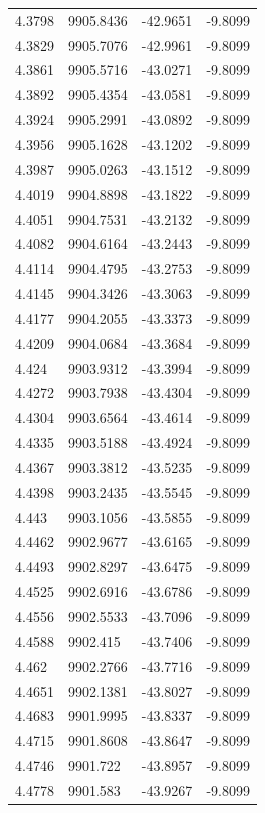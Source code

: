 \begin{table}[H]
\begin{tabular}{llll}
4.3798 & 9905.8436 & -42.9651 & -9.8099 \\
4.3829 & 9905.7076 & -42.9961 & -9.8099 \\
4.3861 & 9905.5716 & -43.0271 & -9.8099 \\
4.3892 & 9905.4354 & -43.0581 & -9.8099 \\
4.3924 & 9905.2991 & -43.0892 & -9.8099 \\
4.3956 & 9905.1628 & -43.1202 & -9.8099 \\
4.3987 & 9905.0263 & -43.1512 & -9.8099 \\
4.4019 & 9904.8898 & -43.1822 & -9.8099 \\
4.4051 & 9904.7531 & -43.2132 & -9.8099 \\
4.4082 & 9904.6164 & -43.2443 & -9.8099 \\
4.4114 & 9904.4795 & -43.2753 & -9.8099 \\
4.4145 & 9904.3426 & -43.3063 & -9.8099 \\
4.4177 & 9904.2055 & -43.3373 & -9.8099 \\
4.4209 & 9904.0684 & -43.3684 & -9.8099 \\
4.424 & 9903.9312 & -43.3994 & -9.8099 \\
4.4272 & 9903.7938 & -43.4304 & -9.8099 \\
4.4304 & 9903.6564 & -43.4614 & -9.8099 \\
4.4335 & 9903.5188 & -43.4924 & -9.8099 \\
4.4367 & 9903.3812 & -43.5235 & -9.8099 \\
4.4398 & 9903.2435 & -43.5545 & -9.8099 \\
4.443 & 9903.1056 & -43.5855 & -9.8099 \\
4.4462 & 9902.9677 & -43.6165 & -9.8099 \\
4.4493 & 9902.8297 & -43.6475 & -9.8099 \\
4.4525 & 9902.6916 & -43.6786 & -9.8099 \\
4.4556 & 9902.5533 & -43.7096 & -9.8099 \\
4.4588 & 9902.415 & -43.7406 & -9.8099 \\
4.462 & 9902.2766 & -43.7716 & -9.8099 \\
4.4651 & 9902.1381 & -43.8027 & -9.8099 \\
4.4683 & 9901.9995 & -43.8337 & -9.8099 \\
4.4715 & 9901.8608 & -43.8647 & -9.8099 \\
4.4746 & 9901.722 & -43.8957 & -9.8099 \\
4.4778 & 9901.583 & -43.9267 & -9.8099 \\

\end{tabular}
\end{table}
